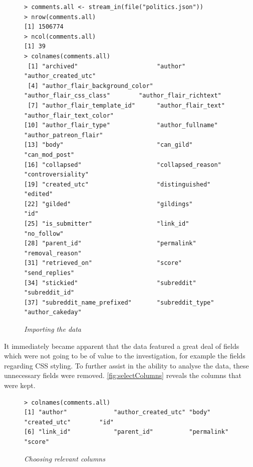 \begin{figure}[H]
\begin{lstlisting}
> comments.all <- stream_in(file("politics.json"))
> nrow(comments.all)
[1] 1506774
> ncol(comments.all)
[1] 39
> colnames(comments.all)
 [1] "archived"                      "author"                        "author_created_utc"           
 [4] "author_flair_background_color" "author_flair_css_class"        "author_flair_richtext"        
 [7] "author_flair_template_id"      "author_flair_text"             "author_flair_text_color"      
[10] "author_flair_type"             "author_fullname"               "author_patreon_flair"         
[13] "body"                          "can_gild"                      "can_mod_post"                 
[16] "collapsed"                     "collapsed_reason"              "controversiality"             
[19] "created_utc"                   "distinguished"                 "edited"                       
[22] "gilded"                        "gildings"                      "id"                           
[25] "is_submitter"                  "link_id"                       "no_follow"                    
[28] "parent_id"                     "permalink"                     "removal_reason"               
[31] "retrieved_on"                  "score"                         "send_replies"                 
[34] "stickied"                      "subreddit"                     "subreddit_id"                 
[37] "subreddit_name_prefixed"       "subreddit_type"                "author_cakeday"     

\end{lstlisting}
\caption{\textit{Importing the data}}
\label{fig:codeImport}
\end{figure}

It immediately became apparent that the data featured a great deal of fields which were not going to be of value to the investigation, for example the fields regarding CSS styling. To further assist in the ability to analyse the data, these unnecessary fields were removed. \autoref{fig:selectColumns} reveals the columns  that were kept.

\begin{figure}[H]
\begin{lstlisting}
> colnames(comments.all)
[1] "author"             "author_created_utc" "body"               "created_utc"        "id"                
[6] "link_id"            "parent_id"          "permalink"          "score"         
\end{lstlisting}
\caption{\textit{Choosing relevant columns}}
\label{fig:selectColumns}
\end{figure}

